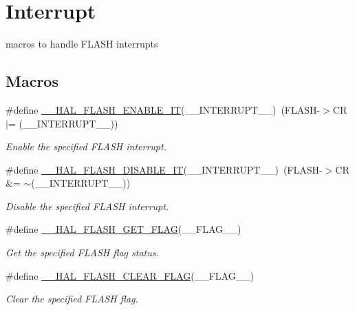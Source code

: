\hypertarget{group___f_l_a_s_h___interrupt}{}\section{Interrupt}
\label{group___f_l_a_s_h___interrupt}


macros to handle F\+L\+A\+SH interrupts  


\subsection*{Macros}
\begin{DoxyCompactItemize}
\item 
\#define \hyperlink{group___f_l_a_s_h___interrupt_ga13fa137a911f02a2f94fb9fb0762a340}{\+\_\+\+\_\+\+H\+A\+L\+\_\+\+F\+L\+A\+S\+H\+\_\+\+E\+N\+A\+B\+L\+E\+\_\+\+IT}(\+\_\+\+\_\+\+I\+N\+T\+E\+R\+R\+U\+P\+T\+\_\+\+\_\+)~(F\+L\+A\+SH-\/$>$CR $\vert$= (\+\_\+\+\_\+\+I\+N\+T\+E\+R\+R\+U\+P\+T\+\_\+\+\_\+))
\begin{DoxyCompactList}\small\item\em Enable the specified F\+L\+A\+SH interrupt. \end{DoxyCompactList}\item 
\#define \hyperlink{group___f_l_a_s_h___interrupt_ga1f40f507b5d4b3a4da68e4244a1097ee}{\+\_\+\+\_\+\+H\+A\+L\+\_\+\+F\+L\+A\+S\+H\+\_\+\+D\+I\+S\+A\+B\+L\+E\+\_\+\+IT}(\+\_\+\+\_\+\+I\+N\+T\+E\+R\+R\+U\+P\+T\+\_\+\+\_\+)~(F\+L\+A\+SH-\/$>$CR \&= $\sim$(\+\_\+\+\_\+\+I\+N\+T\+E\+R\+R\+U\+P\+T\+\_\+\+\_\+))
\begin{DoxyCompactList}\small\item\em Disable the specified F\+L\+A\+SH interrupt. \end{DoxyCompactList}\item 
\#define \hyperlink{group___f_l_a_s_h___interrupt_ga0d3dd161fecc0e47c9e109c7c28672c1}{\+\_\+\+\_\+\+H\+A\+L\+\_\+\+F\+L\+A\+S\+H\+\_\+\+G\+E\+T\+\_\+\+F\+L\+AG}(\+\_\+\+\_\+\+F\+L\+A\+G\+\_\+\+\_\+)
\begin{DoxyCompactList}\small\item\em Get the specified F\+L\+A\+SH flag status. \end{DoxyCompactList}\item 
\#define \hyperlink{group___f_l_a_s_h___interrupt_ga68e49c4675761e2ec35153e747de7622}{\+\_\+\+\_\+\+H\+A\+L\+\_\+\+F\+L\+A\+S\+H\+\_\+\+C\+L\+E\+A\+R\+\_\+\+F\+L\+AG}(\+\_\+\+\_\+\+F\+L\+A\+G\+\_\+\+\_\+)
\begin{DoxyCompactList}\small\item\em Clear the specified F\+L\+A\+SH flag. \end{DoxyCompactList}\end{DoxyCompactItemize}


